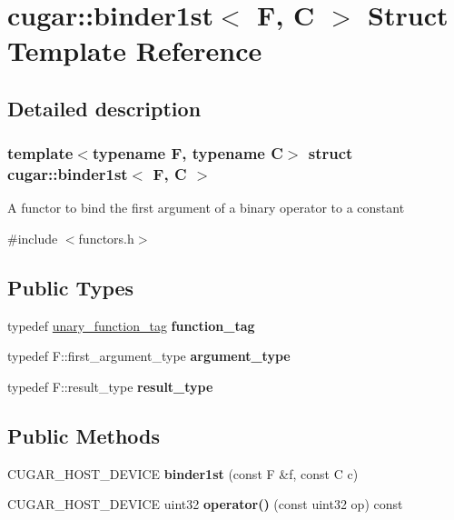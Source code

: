 \hypertarget{structcugar_1_1binder1st}{}\section{cugar\+:\+:binder1st$<$ F, C $>$ Struct Template Reference}
\label{structcugar_1_1binder1st}


\subsection{Detailed description}
\subsubsection*{template$<$typename F, typename C$>$\newline
struct cugar\+::binder1st$<$ F, C $>$}

A functor to bind the first argument of a binary operator to a constant 

{\ttfamily \#include $<$functors.\+h$>$}

\subsection*{Public Types}
\begin{DoxyCompactItemize}
\item 
\mbox{\label{structcugar_1_1binder1st_afc90e7eebec1fa0859221440d0db0f0e}} 
typedef \hyperlink{structcugar_1_1unary__function__tag}{unary\+\_\+function\+\_\+tag} {\bfseries function\+\_\+tag}
\item 
\mbox{\label{structcugar_1_1binder1st_abfd205576211a97918cecb89d1ca16b1}} 
typedef F\+::first\+\_\+argument\+\_\+type {\bfseries argument\+\_\+type}
\item 
\mbox{\label{structcugar_1_1binder1st_af9dfd42d98286c486df3a9070392358d}} 
typedef F\+::result\+\_\+type {\bfseries result\+\_\+type}
\end{DoxyCompactItemize}
\subsection*{Public Methods}
\begin{DoxyCompactItemize}
\item 
\mbox{\label{structcugar_1_1binder1st_a481275b07587ed7ad3ab8d41aa495438}} 
C\+U\+G\+A\+R\+\_\+\+H\+O\+S\+T\+\_\+\+D\+E\+V\+I\+CE {\bfseries binder1st} (const F \&f, const C c)
\item 
\mbox{\label{structcugar_1_1binder1st_ae6861b68903fa347c19cebbb8403d3bc}} 
C\+U\+G\+A\+R\+\_\+\+H\+O\+S\+T\+\_\+\+D\+E\+V\+I\+CE uint32 {\bfseries operator()} (const uint32 op) const
\end{DoxyCompactItemize}
